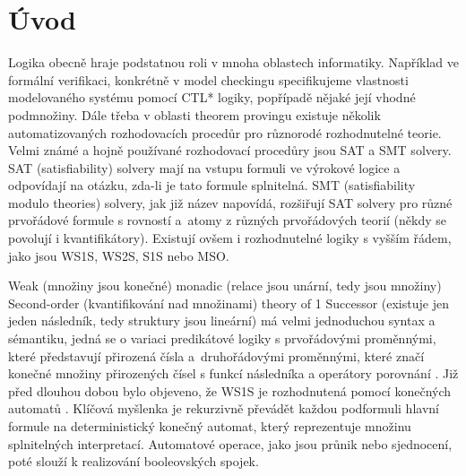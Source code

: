 \chapter{Úvod}


Logika obecně hraje podstatnou roli v mnoha oblastech informatiky. Například ve formální verifikaci, konkrétně v model checkingu specifikujeme vlastnosti modelovaného systému pomocí CTL* logiky, popřípadě nějaké její vhodné podmnožiny. Dále třeba v oblasti theorem provingu existuje několik automatizovaných rozhodovacích procedůr pro různorodé rozhodnutelné teorie. Velmi známé a hojně používané rozhodovací procedůry jsou SAT a SMT solvery. SAT (satisfiability) solvery mají na vstupu formuli ve výrokové logice a odpovídají na otázku, zda-li je tato formule splnitelná. SMT (satisfiability modulo theories) solvery, jak již název napovídá, rozšiřují SAT solvery pro různé prvořádové formule s rovností a~atomy z různých prvořádových teorií (někdy se povolují i kvantifikátory). Existují ovšem i rozhodnutelné logiky s vyšším řádem, jako jsou WS1S, WS2S, S1S nebo MSO.





Weak (množiny jsou konečné) monadic (relace jsou unární, tedy jsou množiny) Second-order (kvantifikování nad množinami) theory of 1 Successor (existuje jen jeden následník, tedy struktury jsou lineární) má velmi jednoduchou syntax a sémantiku, jedná se o variaci predikátové logiky s prvořádovými proměnnými, které představují přirozená čísla a~druhořádovými proměnnými, které značí konečné množiny přirozených čísel s funkcí následníka a operátory porovnání \cite{mona_restrictions}. Již před dlouhou dobou bylo objeveno, že WS1S je rozhodnutená pomocí konečných automatů \cite{buchi_ws1s_fa}. Klíčová myšlenka je rekurzivně převádět každou podformuli hlavní formule na deterministický konečný automat, který reprezentuje množinu splnitelných interpretací. Automatové operace, jako jsou průnik nebo sjednocení, poté slouží k realizování booleovských spojek. 

